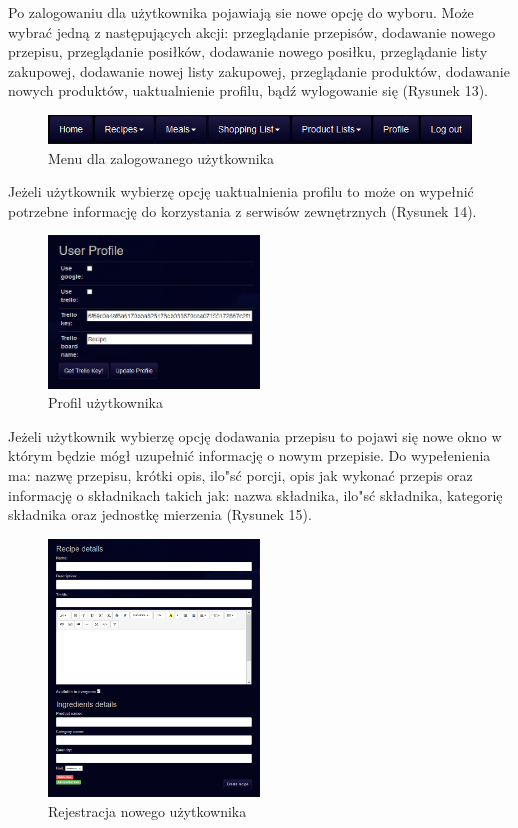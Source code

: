 \documentclass{article}
\begin{document}
Po zalogowaniu dla użytkownika pojawiają sie nowe opcję do wyboru. Może wybrać jedną z następujących akcji: przeglądanie przepisów, dodawanie nowego przepisu, przeglądanie posiłków, dodawanie nowego posiłku, przeglądanie listy zakupowej, dodawanie nowej listy zakupowej, przeglądanie produktów, dodawanie nowych produktów, uaktualnienie profilu, bądź wylogowanie się (Rysunek 13).
\begin{figure}[!ht]
  \centering
    \includegraphics[width=1\textwidth]{reshp4}\par\vspace{1cm}
  \caption{Menu dla zalogowanego użytkownika}
\end{figure}

Jeżeli użytkownik wybierzę opcję uaktualnienia profilu to może on wypełnić potrzebne informację do korzystania z serwisów zewnętrznych (Rysunek 14).
\begin{figure}[!ht]
  \centering
    \includegraphics[width=0.5\textwidth]{reshp5}\par\vspace{1cm}
  \caption{Profil użytkownika}
\end{figure}

Jeżeli użytkownik wybierzę opcję dodawania przepisu to pojawi się nowe okno w którym będzie mógł uzupełnić informację o nowym przepisie. Do wypełenienia ma: nazwę przepisu, krótki opis, ilo"sć porcji, opis jak wykonać przepis oraz informację o składnikach takich jak: nazwa składnika, ilo"sć składnika, kategorię składnika oraz jednostkę mierzenia (Rysunek 15).
\begin{figure}[!ht]
  \centering
    \includegraphics[width=0.5\textwidth]{reshp6}\par\vspace{1cm}
  \caption{Rejestracja nowego użytkownika}
\end{figure}
\end{document}
